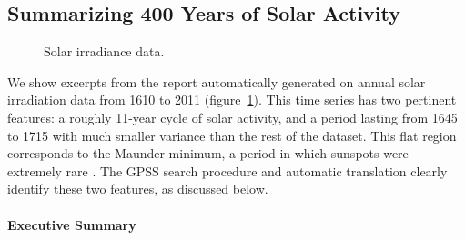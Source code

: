 \documentclass{article}
\begin{document}
\subsection{Summarizing 400 Years of Solar Activity}
\label{sec:solar}

\begin{figure}[h]
\centering
{}
\caption{
Solar irradiance data.}
\label{fig:solar}
\end{figure}

We show excerpts from the report automatically generated on annual solar irradiation data from 1610 to 2011 (figure~\ref{fig:solar}).
This time series has two pertinent features: a roughly 11-year cycle of solar activity, and a period lasting from 1645 to 1715 with much smaller variance than the rest of the dataset.  This flat region corresponds to the Maunder minimum, a period in which sunspots were extremely rare \citep{lean1995reconstruction}.
The GPSS search procedure and automatic translation clearly identify these two features, as discussed below.

\paragraph{Executive Summary}
\end{document}
